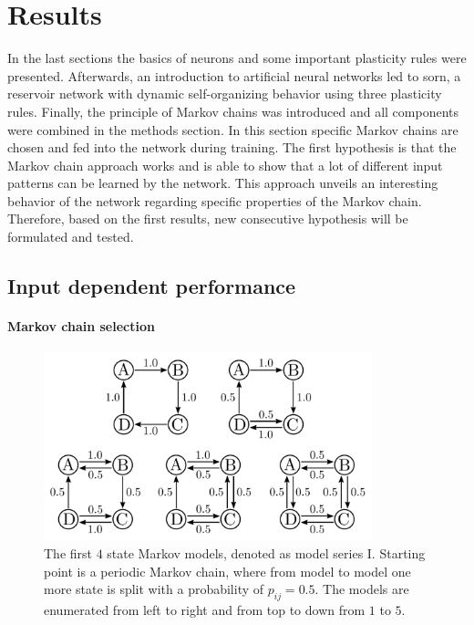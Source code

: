 \section{Results}
\label{sec:results}

In the last sections the basics of neurons and some important plasticity rules were presented. Afterwards, an introduction to artificial neural networks led to \ac{sorn}, a reservoir network with dynamic self-organizing behavior using three plasticity rules. Finally, the principle of Markov chains was introduced and all components were combined in the methods section. In this section specific Markov chains are chosen and fed into the network during training. The first hypothesis is that the Markov chain approach works and is able to show that a lot of different input patterns can be learned by the network. This approach unveils an interesting behavior of the network regarding specific properties of the Markov chain. Therefore, based on the first results, new consecutive hypothesis will be formulated and tested.

\subsection{Input dependent performance}
\label{sec:input-dep-per}

\paragraph{Markov chain selection}

\begin{figure}[!b]
	\centering
	\includegraphics[width=0.85\textwidth]{results/mc1_models}
	\caption[First Markov models]{The first $4$ state Markov models, denoted as model series I. Starting point is a periodic Markov chain, where from model to model one more state is split with a probability of $p_{ij} = 0.5$. The models are enumerated from left to right and from top to down from $1$ to $5$.}
	\label{fig:mc1-models}
\end{figure}

